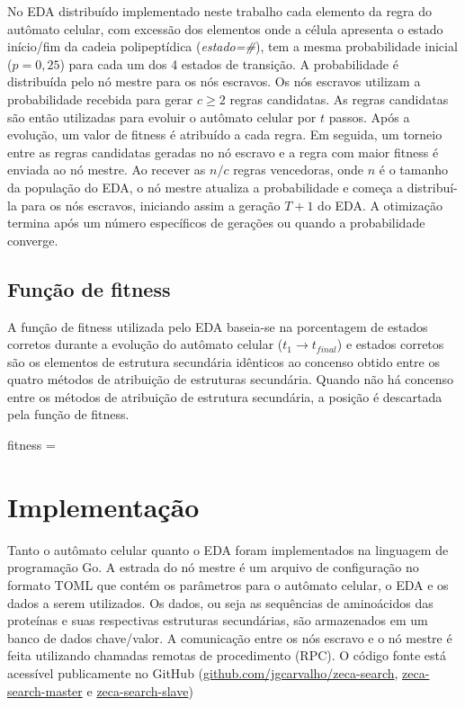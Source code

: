 No EDA distribuído implementado neste trabalho cada elemento da regra do autômato celular, com excessão dos elementos onde a célula apresenta o estado início/fim da cadeia polipeptídica (\textit{estado=\#}),  tem a mesma probabilidade inicial ($p=0,25$) para cada um dos 4 estados de transição. A probabilidade é distribuída pelo nó mestre para os nós escravos. Os nós escravos utilizam a probabilidade recebida para gerar $c \ge 2 $ regras candidatas. As regras candidatas são então utilizadas para evoluir o autômato celular por $t$ passos. Após a evolução, um valor de fitness é atribuído a cada regra. Em seguida, um torneio entre as regras candidatas geradas no nó escravo e a regra com maior fitness é enviada ao nó mestre. Ao recever as $n/c$ regras vencedoras, onde $n$ é o tamanho da população do EDA, o nó mestre atualiza a probabilidade e começa a distribuí-la para os nós escravos, iniciando assim a geração $T+1$ do EDA. A otimização termina após um número específicos de gerações ou quando a probabilidade converge.

\subsection{Função de fitness}

A função de fitness utilizada pelo EDA baseia-se na porcentagem de estados corretos durante a evolução do autômato celular ($t_1 \rightarrow t_{final}$) e estados corretos são os elementos de estrutura secundária idênticos ao concenso obtido entre os quatro métodos de atribuição de estruturas secundária. Quando não há concenso entre os métodos de atribuição de estrutura secundária, a posição é descartada pela função de fitness.   

fitness = 

\section{Implementação}

Tanto o autômato celular quanto o EDA foram implementados na linguagem de programação Go. A estrada do nó mestre é um arquivo de configuração no formato TOML que contém os parâmetros para o autômato celular, o EDA e os dados a serem utilizados. Os dados, ou seja as sequências de aminoácidos das proteínas e suas respectivas estruturas secundárias, são armazenados em um banco de dados chave/valor. A comunicação entre os nós escravo e o nó mestre é feita utilizando chamadas remotas de procedimento (RPC). O código fonte está acessível publicamente no GitHub (\href{https://github.com/jgcarvalho/zeca-search}{github.com/jgcarvalho/zeca-search}, \href{https://github.com/jgcarvalho/zeca-search-master}{zeca-search-master} e \href{https://github.com/jgcarvalho/zeca-search-slave}{zeca-search-slave})  

